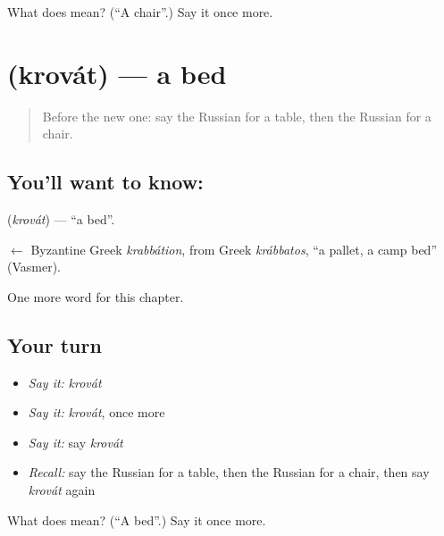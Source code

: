 \begin{tcolorbox}[breakable,colback=teal!4,colframe=teal!35!black,title={Before you move on}]
What does  mean? (\textquotedblleft{}A chair\textquotedblright{}.) Say it once more.
\end{tcolorbox}
\section[\texorpdfstring{\ru{кровать} (krovát)}{кровать (krovát)}]{ (krovát) — a bed}

\label{lesson:RU-C49-bed}



\begin{quote}
Before the new one: say the Russian for a table, then the Russian for a chair.
\end{quote}

\subsection*{You'll want to know: }
\textbf{} (\emph{krovát}) — \textquotedblleft{}a bed\textquotedblright{}.

\begin{cousinweb}
\textbf{} $\leftarrow$ Byzantine Greek \emph{krabbátion}, from Greek \emph{krábbatos}, \textquotedblleft{}a pallet, a camp bed\textquotedblright{} (Vasmer).
\end{cousinweb}

\begin{grammarlens}[title={What you've built}]
One more word for this chapter.
\end{grammarlens}

\subsection*{Your turn}
\begin{itemize}
\raggedright
  \item \emph{Say it:} \emph{krovát}
  \item \emph{Say it:} \emph{krovát}, once more
  \item \emph{Say it:} say \emph{krovát}
  \item \emph{Recall:} say the Russian for a table, then the Russian for a chair, then say \emph{krovát} again
\end{itemize}

\begin{tcolorbox}[breakable,colback=teal!4,colframe=teal!35!black,title={Before you move on}]
What does  mean? (\textquotedblleft{}A bed\textquotedblright{}.) Say it once more.
\end{tcolorbox}
